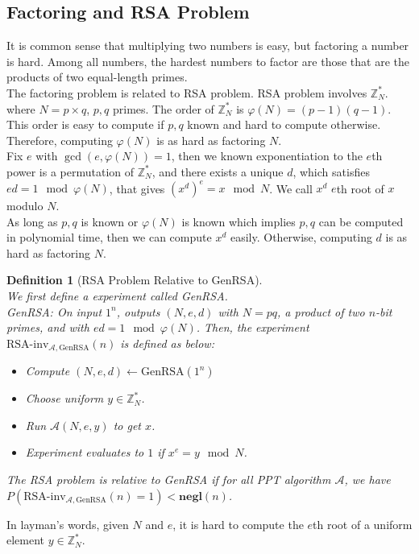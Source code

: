 \documentclass[12pt]{article}
\newtheorem{definition}{Definition}[section]
\theoremstyle{definition}
\begin{document}
\subsection{Factoring and RSA Problem}
It is common sense that multiplying two numbers is easy, but factoring a number is hard. Among all numbers, the hardest numbers to factor are those that are the products of two equal-length primes.\\
The factoring problem is related to RSA problem. RSA problem involves $\mathbb{Z}_N^\ast$. where $N=p\times q$, $p,q$ primes. The order of $\mathbb{Z}_N^\ast$ is $\varphi(N)=(p-1)(q-1)$. This order is easy to compute if $p,q$ known and hard to compute otherwise. Therefore, computing $\varphi(N)$ is as hard as factoring $N$.\\
Fix $e$ with $\gcd(e,\varphi(N))=1$, then we known exponentiation to the $e$th power is a permutation of $\mathbb{Z}_N^\ast$, and there exists a unique $d$, which satisfies $ed=1\mod \varphi(N)$, that gives $(x^d)^e=x\mod N$. We call $x^d$ $e$th root of $x$ modulo $N$.\\
As long as $p,q$ is known or $\varphi(N)$ is known which implies $p,q$ can be computed in polynomial time, then we can compute $x^d$ easily. Otherwise, computing $d$ is as hard as factoring $N$.
\begin{definition}[RSA Problem Relative to GenRSA]
\hfill\\\normalfont We first define a experiment called GenRSA.\\
GenRSA: On input $1^n$, outputs $(N,e,d)$ with $N=pq$, a product of two $n$-bit primes, and with $ed=1\mod \varphi(N)$. Then, the experiment $\text{RSA-inv}_{\mathcal{A}, \text{GenRSA}}(n)$ is defined as below:
\begin{itemize}
  \item Compute $(N,e,d)\leftarrow \text{GenRSA}(1^n)$
  \item Choose uniform $y\in \mathbb{Z}_N^\ast$.
  \item Run $\mathcal{A}(N,e,y)$ to get $x$.
  \item Experiment evaluates to $1$ if $x^e=y \mod N$.
\end{itemize}
The RSA problem is relative to GenRSA if for all PPT algorithm $\mathcal{A}$, we have $P(\text{RSA-inv}_{\mathcal{A}, \text{GenRSA}}(n)=1)<\mathbf{negl}(n)$.
\end{definition}
In layman's words, given $N$ and $e$, it is hard to compute the $e$th root of a uniform element $y\in\mathbb{Z}_N^\ast$.\\
\end{document}
